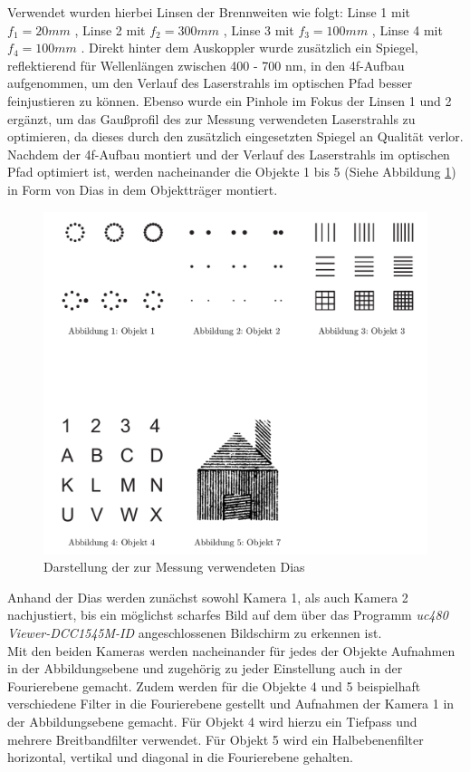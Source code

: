 Verwendet wurden hierbei Linsen der Brennweiten wie folgt: Linse 1 mit $f_{1}=20mm$ , Linse 2 mit $f_{2}=300mm$ , Linse 3 mit $f_{3}=100mm$ , Linse 4 mit $f_{4}=100mm$ .
Direkt hinter dem Auskoppler wurde zusätzlich ein Spiegel, reflektierend für Wellenlängen zwischen 400 - 700 nm, in den 4f-Aufbau aufgenommen, um den Verlauf des Laserstrahls im optischen Pfad besser feinjustieren zu können. Ebenso wurde ein Pinhole im Fokus der Linsen 1 und 2 ergänzt, um das Gaußprofil des zur Messung verwendeten Laserstrahls zu optimieren, da dieses durch den zusätzlich eingesetzten Spiegel an Qualität verlor. \\

Nachdem der 4f-Aufbau montiert und der Verlauf des Laserstrahls im optischen Pfad optimiert ist, werden nacheinander die Objekte 1 bis 5 (Siehe Abbildung \ref{fig:Objekte-aus-Anleitungsheft}) in Form von Dias in dem Objektträger montiert. 
\begin{figure}
\centering
\includegraphics[width=0.7\linewidth]{images/Anleitungsheft/Objekte-aus-Anleitungsheft}
\caption{Darstellung der zur Messung verwendeten Dias}
\label{fig:Objekte-aus-Anleitungsheft}
\end{figure}

Anhand der Dias werden zunächst sowohl Kamera 1, als auch Kamera 2 nachjustiert, bis ein möglichst scharfes Bild auf dem über das Programm \textit{uc480 Viewer-DCC1545M-ID} angeschlossenen Bildschirm zu erkennen ist.  \\
Mit den beiden Kameras werden nacheinander für jedes der Objekte Aufnahmen in der Abbildungsebene und zugehörig zu jeder Einstellung auch in der Fourierebene gemacht. Zudem werden für die Objekte 4 und 5 beispielhaft verschiedene Filter in die Fourierebene gestellt und Aufnahmen der Kamera 1 in der Abbildungsebene gemacht. Für Objekt 4 wird hierzu ein Tiefpass und mehrere Breitbandfilter verwendet. Für Objekt 5 wird ein Halbebenenfilter horizontal, vertikal und diagonal in die Fourierebene gehalten. \\

